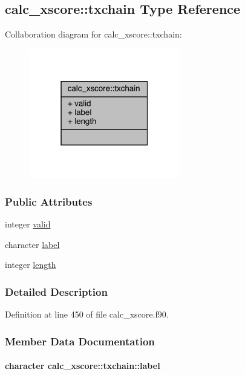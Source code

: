 \hypertarget{structcalc__xscore_1_1txchain}{\subsection{calc\-\_\-xscore\-:\-:txchain Type Reference}
\label{structcalc__xscore_1_1txchain}
}


Collaboration diagram for calc\-\_\-xscore\-:\-:txchain\-:
\nopagebreak
\begin{figure}[H]
\begin{center}
\leavevmode
\includegraphics[width=187pt]{structcalc__xscore_1_1txchain__coll__graph}
\end{center}
\end{figure}
\subsubsection*{Public Attributes}
\begin{DoxyCompactItemize}
\item 
integer \hyperlink{structcalc__xscore_1_1txchain_a5ceade9eb8de5cc9e210bb0257d126e4}{valid}
\item 
character \hyperlink{structcalc__xscore_1_1txchain_aa03ad0c995e3e2def5ad8ca92fa1f450}{label}
\item 
integer \hyperlink{structcalc__xscore_1_1txchain_a2c3d755716e8a35a0901f664c83cdeef}{length}
\end{DoxyCompactItemize}


\subsubsection{Detailed Description}


Definition at line 450 of file calc\-\_\-xscore.\-f90.



\subsubsection{Member Data Documentation}
\hypertarget{structcalc__xscore_1_1txchain_aa03ad0c995e3e2def5ad8ca92fa1f450}{
\paragraph[{label}]{\setlength{\rightskip}{0pt plus 5cm}character calc\-\_\-xscore\-::txchain\-::label}}\label{structcalc__xscore_1_1txchain_aa03ad0c995e3e2def5ad8ca92fa1f450}


